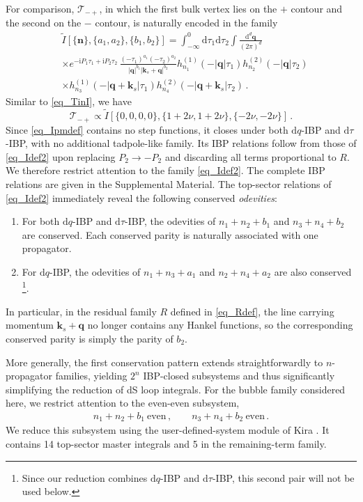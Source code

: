 \documentclass[%
 reprint,
 amsmath,amssymb,
 aps,
prd,
]{revtex4-2}
\def\ie{\begin{equation}\begin{aligned}}
\def\fe{\end{aligned}\end{equation}}
\def\di{{\mathrm{d}}}
\def\mb{\mathbf}
\def\ii{\mathrm{i}}
\def\to{\rightarrow}
\begin{document}
For comparison, \(\mathcal T_{-+}\), in which the first bulk vertex lies on the \(+\) contour and the second on the \(-\) contour, is naturally encoded in the family
\ie\label{eq_Ipmdef}
& \widetilde I[\{\bm{n}\},\{a_1,a_2\},\{b_1,b_2\}] = \int_{-\infty}^0 \di\tau_1\di\tau_2 \int \frac{\di^d \mb q}{(2\pi)^d}\,\\
&\times  e^{-\ii P_1\tau_1+\ii P_2 \tau_2}\,
	\frac{(-\tau_1)^{a_1}(-\tau_2)^{a_2}}{|\mb q|^{b_1}|\mb k_s+\mb q|^{b_2}} h_{n_1}^{(1)}(-|\mb q|\tau_1)h_{n_2}^{(2)}(-|\mb q|\tau_2) \\
&\times h_{n_3}^{(1)}(-|\mb q+\mb k_s|\tau_1)h_{n_4}^{(2)}(-|\mb q+\mb k_s|\tau_2)\,.
\fe
Similar to \eqref{eq_TinI}, we have
\begin{equation}
\mathcal T_{-+} \propto \widetilde I[\{0,0,0,0\},\{1+2\nu,1+2\nu\},\{-2\nu,-2\nu\}]\,.
\end{equation}
Since \eqref{eq_Ipmdef} contains no step functions, it closes under both \(\di q\)-IBP and \(\di\tau\)-IBP, with no additional tadpole-like family. Its IBP relations follow from those of \eqref{eq_Idef2} upon replacing \(P_2\to -P_2\) and discarding all terms proportional to \(R\). We therefore restrict attention to the family \eqref{eq_Idef2}. The complete IBP relations are given in the Supplemental Material. The top-sector relations of \eqref{eq_Idef2} immediately reveal the following conserved \emph{odevities}:
\begin{enumerate}
\item For both \(\di q\)-IBP and \(\di \tau\)-IBP, the odevities of \(n_1+n_2+b_1\) and \(n_3+n_4+b_2\) are conserved. Each conserved parity is naturally associated with one propagator.
\item For \(\di q\)-IBP, the odevities of \(n_1+n_3+a_1\) and \(n_2+n_4+a_2\) are also conserved \footnote{Since our reduction combines \(\di q\)-IBP and \(\di \tau\)-IBP, this second pair will not be used below.}.
\end{enumerate}
In particular, in the residual family \(R\) defined in \eqref{eq_Rdef}, the line carrying momentum \(\mb k_s+\mb q\) no longer contains any Hankel functions, so the corresponding conserved parity is simply the parity of \(b_2\).

More generally, the first conservation pattern extends straightforwardly to \(n\)-propagator families, yielding \(2^n\) IBP-closed subsystems and thus significantly simplifying the reduction of dS loop integrals. For the bubble family considered here, we restrict attention to the even-even subsystem,
\begin{align}
n_1+n_2+b_1 \ \text{even}\,,\qquad n_3+n_4+b_2 \ \text{even}\,.
\label{eq:parity_even_sector}
\end{align}
We reduce this subsystem using the user-defined-system module of Kira \cite{Maierhofer:2017gsa,Klappert:2020nbg,Lange:2025fba}. It contains 14 top-sector master integrals and 5 in the remaining-term family.
\end{document}
